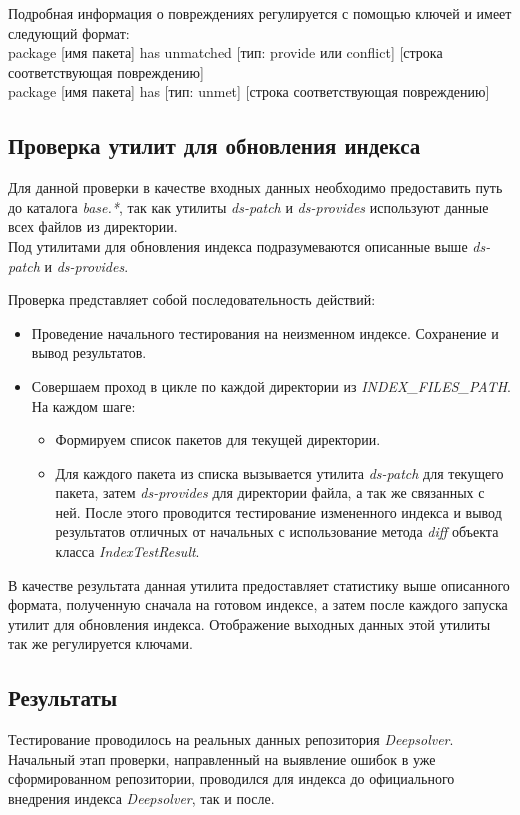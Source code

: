 Подробная информация о повреждениях регулируется с помощью ключей и имеет следующий формат:\\
package [имя пакета] has unmatched [тип: provide или conflict] [строка соответствующая повреждению]\\
package [имя пакета] has [тип: unmet] [строка соответствующая повреждению]\\

\subsection{Проверка утилит для обновления индекса}
Для данной проверки в качестве входных данных необходимо предоставить
путь до каталога \textit{base.*}, так как утилиты \textit{ds-patch} и 
\textit{ds-provides} используют данные всех файлов из директории.\\
Под утилитами для обновления индекса подразумеваются описанные
выше \textit{ds-patch} и \textit{ds-provides}.

Проверка представляет собой последовательность действий:\\
\begin{itemize}
\item{Проведение начального тестирования на неизменном индексе. Сохранение
и вывод результатов.}
\item{Совершаем проход в цикле по каждой директории из \emph{INDEX\_FILES\_PATH}. На
каждом шаге:
	\begin{itemize}
	\item{Формируем список пакетов для текущей директории.}
	\item{Для каждого пакета из списка вызывается утилита \textit{ds-patch }
	для текущего пакета, затем \textit{ds-provides} для директории файла, а 
	так же связанных с ней. После этого проводится тестирование
	измененного индекса и вывод результатов отличных от начальных
	с использование метода \textit{diff} объекта класса \textit{IndexTestResult}.}
	\end{itemize}
}
\end{itemize}

В качестве результата данная утилита предоставляет статистику выше описанного формата,
полученную сначала на готовом индексе, а затем после каждого запуска утилит для обновления
индекса. Отображение выходных данных этой утилиты так же регулируется ключами.

\subsection{Результаты}
Тестирование проводилось на реальных данных репозитория \textit{Deepsolver}.
Начальный этап проверки, направленный на выявление ошибок в уже сформированном репозитории,
проводился для индекса до официального внедрения индекса \textit{Deepsolver}, так и 
после.\\

